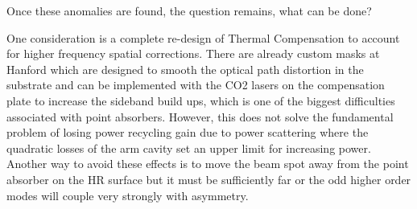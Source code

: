 	 \indent Once these anomalies are found, the question remains, what can be done?
	 
	 One consideration is a complete re-design of Thermal Compensation to account for higher frequency spatial corrections. There are already custom masks at Hanford which are designed to smooth the optical path distortion in the substrate and can be implemented with the CO2 lasers on the compensation plate to increase the sideband build ups, which is one of the biggest difficulties associated with point absorbers.  However, this does not solve the fundamental problem of losing power recycling gain due to power scattering where the quadratic losses of the arm cavity set an upper limit for increasing power.  Another way to avoid these effects is to move the beam spot away from the point absorber on the HR surface but it must be sufficiently far or the odd higher order modes will couple very strongly with asymmetry. 
	 
